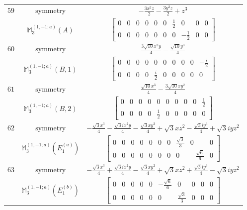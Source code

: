 \documentclass[fleqn,8pt,landscape]{jsarticle}
\begin{document}
\begin{longtable}{ccc}
$ 59 $ & $ \text{symmetry} $ & $ - \frac{3 x^{2} z}{2} - \frac{3 y^{2} z}{2} + z^{3} $ \\
$  $ & $ \mathbb{M}_{3}^{(1,-1;a)}(A) $ & $ \begin{bmatrix} 0 & 0 & 0 & 0 & 0 & 0 & \frac{1}{2} & 0 & 0 & 0 \\ 0 & 0 & 0 & 0 & 0 & 0 & 0 & - \frac{1}{2} & 0 & 0 \end{bmatrix} $ \\ \hline
$ 60 $ & $ \text{symmetry} $ & $ \frac{3 \sqrt{10} x^{2} y}{4} - \frac{\sqrt{10} y^{3}}{4} $ \\
$  $ & $ \mathbb{M}_{3}^{(1,-1;a)}(B,1) $ & $ \begin{bmatrix} 0 & 0 & 0 & 0 & 0 & 0 & 0 & 0 & 0 & - \frac{i}{2} \\ 0 & 0 & 0 & 0 & \frac{i}{2} & 0 & 0 & 0 & 0 & 0 \end{bmatrix} $ \\ \hline
$ 61 $ & $ \text{symmetry} $ & $ \frac{\sqrt{10} x^{3}}{4} - \frac{3 \sqrt{10} x y^{2}}{4} $ \\
$  $ & $ \mathbb{M}_{3}^{(1,-1;a)}(B,2) $ & $ \begin{bmatrix} 0 & 0 & 0 & 0 & 0 & 0 & 0 & 0 & 0 & \frac{1}{2} \\ 0 & 0 & 0 & 0 & \frac{1}{2} & 0 & 0 & 0 & 0 & 0 \end{bmatrix} $ \\ \hline
$ 62 $ & $ \text{symmetry} $ & $ - \frac{\sqrt{3} x^{3}}{4} - \frac{\sqrt{3} i x^{2} y}{4} - \frac{\sqrt{3} x y^{2}}{4} + \sqrt{3} x z^{2} - \frac{\sqrt{3} i y^{3}}{4} + \sqrt{3} i y z^{2} $ \\
$  $ & $ \mathbb{M}_{3}^{(1,-1;a)}(E_{1}^{(a)}) $ & $ \begin{bmatrix} 0 & 0 & 0 & 0 & 0 & 0 & 0 & \frac{\sqrt{3}}{3} & 0 & 0 \\ 0 & 0 & 0 & 0 & 0 & 0 & 0 & 0 & - \frac{\sqrt{6}}{6} & 0 \end{bmatrix} $ \\ \hline
$ 63 $ & $ \text{symmetry} $ & $ - \frac{\sqrt{3} x^{3}}{4} + \frac{\sqrt{3} i x^{2} y}{4} - \frac{\sqrt{3} x y^{2}}{4} + \sqrt{3} x z^{2} + \frac{\sqrt{3} i y^{3}}{4} - \sqrt{3} i y z^{2} $ \\
$  $ & $ \mathbb{M}_{3}^{(1,-1;a)}(E_{1}^{(b)}) $ & $ \begin{bmatrix} 0 & 0 & 0 & 0 & 0 & - \frac{\sqrt{6}}{6} & 0 & 0 & 0 & 0 \\ 0 & 0 & 0 & 0 & 0 & 0 & \frac{\sqrt{3}}{3} & 0 & 0 & 0 \end{bmatrix} $ \\ \hline

\end{longtable}
\end{document}
